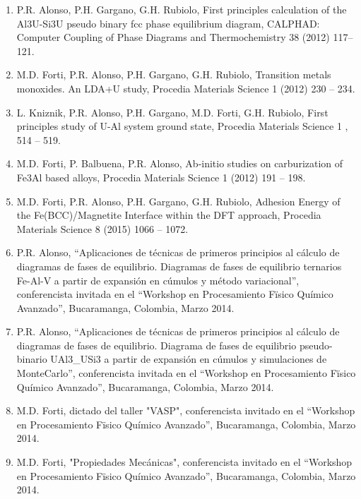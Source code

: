 \begin{enumerate}
\item  P.R. Alonso, P.H. Gargano, G.H. Rubiolo, First principles calculation 
of the Al3U-Si3U pseudo binary fcc phase equilibrium diagram, CALPHAD: Computer 
Coupling of Phase Diagrams and Thermochemistry 38 (2012) 117–121.

\item  M.D. Forti, P.R. Alonso, P.H. Gargano, G.H. Rubiolo, Transition 
metals monoxides. An LDA+U study, Procedia Materials Science 1 (2012) 230 – 234.

\item L. Kniznik, P.R. Alonso, P.H. Gargano, M.D. Forti, G.H. Rubiolo, First 
principles study of U-Al system ground state, Procedia Materials Science 1 , 514 – 519.

\item  M.D. Forti, P. Balbuena, P.R. Alonso, Ab-initio studies on 
carburization of Fe3Al based alloys, Procedia Materials Science 1 (2012) 191 – 
198.

\item  M.D. Forti, P.R. Alonso, P.H. Gargano, G.H. Rubiolo, Adhesion Energy 
of the Fe(BCC)/Magnetite Interface within the DFT approach, Procedia Materials 
Science 8 (2015) 1066 – 1072.

\item  P.R. Alonso, “Aplicaciones de técnicas de primeros principios al 
cálculo de diagramas de fases de equilibrio. Diagramas de fases de equilibrio 
ternarios Fe-Al-V a partir de expansión en cúmulos y método variacional”, 
conferencista invitada en el “Workshop en Procesamiento Fïsico Químico 
Avanzado”, Bucaramanga, Colombia, Marzo 2014.

\item  P.R. Alonso, “Aplicaciones de técnicas de primeros principios al 
cálculo de diagramas de fases de equilibrio. Diagrama de fases de equilibrio 
pseudo-binario UAl3\_USi3 a partir de expansión en cúmulos y simulaciones de 
MonteCarlo”, conferencista invitada en el “Workshop en Procesamiento Fïsico 
Químico Avanzado”, Bucaramanga, Colombia, Marzo 2014.

\item M.D. Forti, dictado del taller "VASP", conferencista invitado en el 
“Workshop en Procesamiento Fïsico Químico Avanzado”, Bucaramanga, Colombia, 
Marzo 2014.

\item  M.D. Forti, "Propiedades Mecánicas", conferencista invitado en el 
“Workshop en Procesamiento Fïsico Químico Avanzado”, Bucaramanga, Colombia, 
Marzo 2014.


\end{enumerate}

